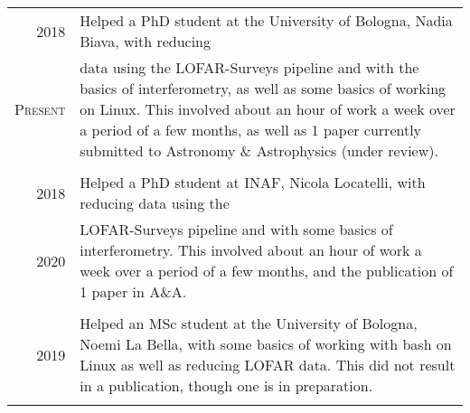 \documentclass[10pt]{article} %
\begin{document}
\begin{tabular}{r|p{12.5cm}}
	\textsc{2018}    & Helped a PhD student at the University of Bologna, Nadia Biava, with reducing\\
	\textsc{Present} & data using the LOFAR-Surveys pipeline and with the basics of interferometry, as
		well as some basics of working on Linux. This involved about an hour of work
		a week over a period of a few months, as well as 1 paper currently submitted to
		Astronomy \& Astrophysics (under review).\\
	\multicolumn{2}{c}{} \\
	
	\textsc{2018}    & Helped a PhD student at INAF, Nicola Locatelli, with reducing data using the\\
	\textsc{2020} & LOFAR-Surveys pipeline and with some basics of interferometry. This involved
	about an hour of work a week over a period of a few months, and the publication
	of 1 paper in A\&A.\\
	\multicolumn{2}{c}{} \\
	
	\textsc{2019}    & Helped an MSc student at the University of Bologna, Noemi La Bella, with some
	basics of working with bash on Linux as well as reducing LOFAR data. This did
	not result in a publication, though one is in preparation.\\
	\multicolumn{2}{c}{} \\
	
	
\end{tabular}


\end{document}
